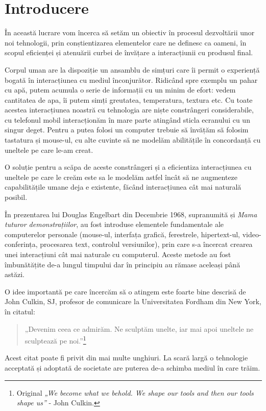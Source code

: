\chapter*{Introducere}


În această lucrare vom încerca să setăm un obiectiv în procesul dezvoltării unor noi tehnologii, prin conștientizarea elementelor care ne definesc ca oameni, în scopul eficienței și atenuării curbei de învățare a interacțiunii cu produsul final.

Corpul uman are la dispoziție un ansamblu de simțuri care îi permit o experiență bogată în interacțiunea cu mediul înconjurător. Ridicând spre exemplu un pahar cu apă, putem acumula o serie de informații cu un minim de efort: vedem cantitatea de apa, îi putem simți greutatea, temperatura, textura etc. Cu toate acestea interacțiunea noastră cu tehnologia are niște constrângeri considerabile, cu telefonul mobil interacționăm în mare parte atingând sticla ecranului cu un singur deget. Pentru a putea folosi un computer trebuie să învățăm să folosim tastatura și mouse-ul, cu alte cuvinte să ne modelăm abilitățile în concordanță cu uneltele pe care le-am creat.

O soluție pentru a scăpa de aceste constrângeri și a eficientiza interacțiunea cu uneltele pe care le creăm este sa le modelăm astfel încât să ne augmenteze capabilitățile umane deja e existente, făcând interacțiunea cât mai naturală posibil.

În prezentarea lui Douglas Engelbart din Decembrie 1968, supranumită și \textit{Mama tuturor demonstrațiilor}, au fost introduse elementele fundamentale ale computerelor personale (mouse-ul, interfața grafică, ferestrele, hipertext-ul, video-conferința, procesarea text, controlul versiunilor), prin care s-a încercat crearea unei interacțiuni cât mai naturale cu computerul. Aceste metode au fost îmbunătățite de-a lungul timpului dar în principiu au rămase aceleași până astăzi.

O idee importantă pe care încercăm să o atingem este foarte bine descrisă de John Culkin, SJ, profesor de comunicare la Universitatea Fordham din New York, în citatul: \begin{quotation}
„Devenim ceea ce admirăm. Ne sculptăm unelte, iar mai apoi uneltele ne sculptează pe noi.”\footnote{Original \textit{„We become what we behold. We shape our tools and then our tools shape us”} - John Culkin.}
\end{quotation}

Acest citat poate fi privit din mai multe unghiuri. La scară largă o tehnologie acceptată și adoptată de societate are puterea de-a schimba mediul în care trăim.

